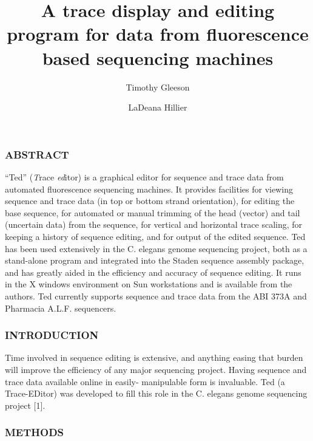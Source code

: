 
\title{A trace display and editing program for data from fluorescence based 
sequencing machines}
\author{Timothy Gleeson \and LaDeana Hillier}


\maketitle
\section*{}
\subsection*{}
\subsubsection*{ABSTRACT}

``Ted'' ({\em T}race {\em ed}itor) 
is a graphical editor for sequence and trace data from automated 
fluorescence sequencing machines.  It provides facilities 
for viewing sequence and trace data (in top or bottom strand 
orientation), for editing the base sequence,  for 
automated or manual trimming of the head (vector) and tail 
(uncertain data) from the sequence, for vertical and horizontal trace 
scaling, for keeping a history of sequence editing, and for output of 
the edited sequence.  Ted has been used extensively in the C. 
elegans genome sequencing project,
both as a stand-alone program and integrated into 
the Staden sequence assembly package, and  has 
greatly aided in the efficiency 
and accuracy of sequence editing.  It runs in the X 
windows environment on Sun workstations and is available from the 
authors.  Ted currently supports sequence and trace data from the ABI 
373A and Pharmacia A.L.F. sequencers.

\subsubsection*{INTRODUCTION}
	Time involved in sequence editing is extensive, and anything easing 
that burden will improve the efficiency of any major sequencing 
project.  Having sequence and trace data available online in easily-
manipulable form is invaluable. Ted (a Trace-EDitor) was developed to 
fill this role in the C. elegans genome 
sequencing project [1]. 

\subsubsection*{METHODS}

